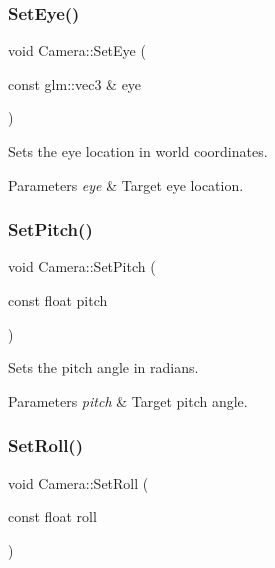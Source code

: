 \subsubsection{\texorpdfstring{Set\+Eye()}{SetEye()}}
{\footnotesize\ttfamily void Camera\+::\+Set\+Eye (\begin{DoxyParamCaption}\item[{const glm\+::vec3 \&}]{eye }\end{DoxyParamCaption})\hspace{0.3cm}{\ttfamily [inline]}}

Sets the eye location in world coordinates. 
\begin{DoxyParams}{Parameters}
{\em eye} & Target eye location. \\
\hline
\end{DoxyParams}
\hypertarget{group___cameras_ga33e125b9d164e7332dba4cc01c468d6c}{}\label{group___cameras_ga33e125b9d164e7332dba4cc01c468d6c} 
\subsubsection{\texorpdfstring{Set\+Pitch()}{SetPitch()}}
{\footnotesize\ttfamily void Camera\+::\+Set\+Pitch (\begin{DoxyParamCaption}\item[{const float}]{pitch }\end{DoxyParamCaption})\hspace{0.3cm}{\ttfamily [inline]}}

Sets the pitch angle in radians. 
\begin{DoxyParams}{Parameters}
{\em pitch} & Target pitch angle. \\
\hline
\end{DoxyParams}
\hypertarget{group___cameras_ga2c07ac7e812f4dab134fc06692fcaf11}{}\label{group___cameras_ga2c07ac7e812f4dab134fc06692fcaf11} 
\subsubsection{\texorpdfstring{Set\+Roll()}{SetRoll()}}
{\footnotesize\ttfamily void Camera\+::\+Set\+Roll (\begin{DoxyParamCaption}\item[{const float}]{roll }\end{DoxyParamCaption})\hspace{0.3cm}{\ttfamily [inline]}}

